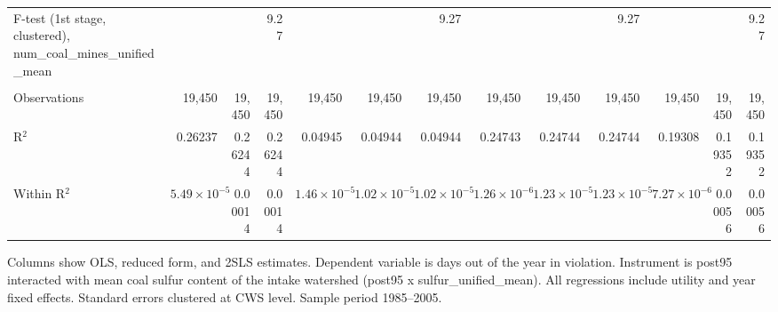 \begin{table}[htbp]
\begin{adjustbox}{width = \textwidth, center}
\begin{tabular}{lrrrrrrrrrrrr}
         F-test (1st stage, clustered), num\_coal\_mines\_unified\_mean     &                       &          & 9.27     &                       &                       & 9.27                  &                       &                       & 9.27                  &                       &          & 9.27\\  
         
          \\
         
         Observations                                                       & 19,450                & 19,450   & 19,450   & 19,450                & 19,450                & 19,450                & 19,450                & 19,450                & 19,450                & 19,450                & 19,450   & 19,450\\  
         R$^2$                                                              & 0.26237               & 0.26244  & 0.26244  & 0.04945               & 0.04944               & 0.04944               & 0.24743               & 0.24744               & 0.24744               & 0.19308               & 0.19352  & 0.19352\\  
         Within R$^2$                                                       & $5.49\times 10^{-5}$  & 0.00014  & 0.00014  & $1.46\times 10^{-5}$  & $1.02\times 10^{-5}$  & $1.02\times 10^{-5}$  & $1.26\times 10^{-6}$  & $1.23\times 10^{-5}$  & $1.23\times 10^{-5}$  & $7.27\times 10^{-6}$  & 0.00056  & 0.00056\\  
         
         \bottomrule
         
      \end{tabular}
      
      
      
   \end{adjustbox}
      {\tiny\linespread{1}\selectfont \par \raggedright 
   Columns show OLS, reduced form, and 2SLS estimates. Dependent variable is days out of the year in violation. Instrument is post95 interacted with mean coal sulfur content of the intake watershed (post95 x sulfur\_unified\_mean). All regressions include utility and year fixed effects. Standard errors clustered at CWS level. Sample period 1985--2005.}
   
\end{table}


